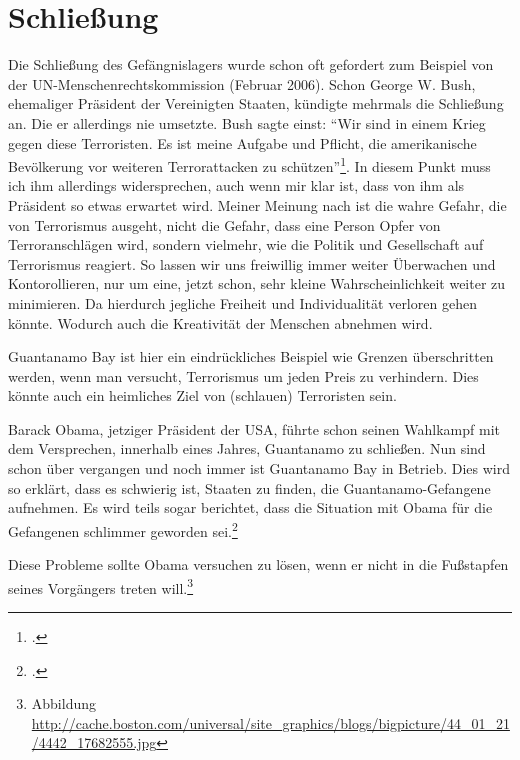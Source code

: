\section{Schließung}
Die Schließung des Gefängnislagers wurde schon oft gefordert zum Beispiel von der
UN-Menschenrechtskommission (Februar 2006).
Schon George W. Bush, ehemaliger Präsident der Vereinigten Staaten, kündigte mehrmals die Schließung
an. Die er allerdings nie umsetzte.
Bush sagte einst: \enquote{Wir sind in einem Krieg gegen diese Terroristen.
Es ist meine Aufgabe und Pflicht, die amerikanische Bevölkerung vor weiteren Terrorattacken
zu schützen}\footcite{DW:Guantanamo}.
In diesem Punkt muss ich ihm allerdings widersprechen, auch wenn mir klar ist, dass von ihm
als Präsident so etwas erwartet wird.
Meiner Meinung nach ist die wahre Gefahr, die von Terrorismus ausgeht, nicht die Gefahr, dass eine Person
Opfer von Terroranschlägen wird, sondern vielmehr, wie die Politik und Gesellschaft auf Terrorismus
reagiert. So lassen wir uns freiwillig immer weiter Überwachen und Kontorollieren, nur um eine,
jetzt schon, sehr kleine Wahrscheinlichkeit weiter zu minimieren. Da hierdurch jegliche
Freiheit und Individualität verloren gehen könnte.
Wodurch auch die Kreativität der Menschen
abnehmen wird.

Guantanamo Bay ist hier ein eindrückliches Beispiel wie Grenzen überschritten werden, wenn man
versucht, Terrorismus um jeden Preis zu verhindern. Dies könnte auch ein heimliches Ziel von
(schlauen) Terroristen sein.

Barack Obama, jetziger Präsident der USA, führte schon seinen Wahlkampf mit dem Versprechen,
innerhalb eines Jahres, Guantanamo zu schließen.
Nun sind schon über  vergangen und noch immer ist
Guantanamo Bay in Betrieb. Dies wird so erklärt, dass es schwierig ist, Staaten zu finden, die
Guantanamo-Gefangene aufnehmen.
Es wird teils sogar berichtet, dass die Situation mit Obama für die Gefangenen schlimmer
geworden sei.\footcite{AlJazeera:Obama_bad}

Diese Probleme sollte Obama versuchen zu lösen, wenn er nicht in die Fußstapfen seines Vorgängers
treten will.\footnote{Abbildung \url{http://cache.boston.com/universal/site_graphics/blogs/bigpicture/44_01_21/4442_17682555.jpg}}

\begin{comment}
\begin{figurewrapper}
	\texttt{[image: files/images/4442\_17682555]}
	\captionof{figure}[Obama in den Fußstapfen von Bush]{Obama in den Fußstapfen von Bush?
		\newline Quelle:
\url{http://cache.boston.com/universal/site_graphics/blogs/bigpicture/44_01_21/4442_17682555.jpg}}
\end{figurewrapper}
\end{comment}

